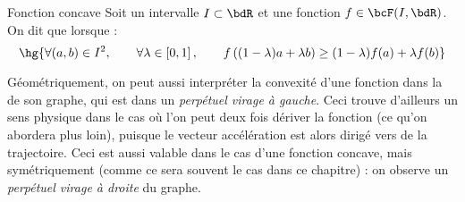 \documentclass[a4paper,french,bookmarks]{report}
\begin{document}
\begin{definition}{Fonction concave}{}
    Soit un intervalle $I \subset \bdR$ et une fonction $f \in \bcF(I, \bdR)$. On dit que  lorsque :
    \[ \hg{\forall (a, b) \in I^2,\qquad \forall \lambda \in \left[0, 1\right],\qquad f\left((1 - \lambda)a + \lambda b\right) \geq (1-\lambda)f(a) + \lambda f(b)}\]
\end{definition}

Géométriquement, on peut aussi interpréter la convexité d'une fonction dans la  de son graphe, qui est dans un \textit{perpétuel virage à gauche}. Ceci trouve d'ailleurs un sens physique dans le cas où l'on peut deux fois dériver la fonction (ce qu'on abordera plus loin), puisque le vecteur accélération est alors dirigé vers  de la trajectoire. Ceci est aussi valable dans le cas d'une fonction concave, mais symétriquement (comme ce sera souvent le cas dans ce chapitre) : on observe un \textit{perpétuel virage à droite} du graphe.
\end{document}
